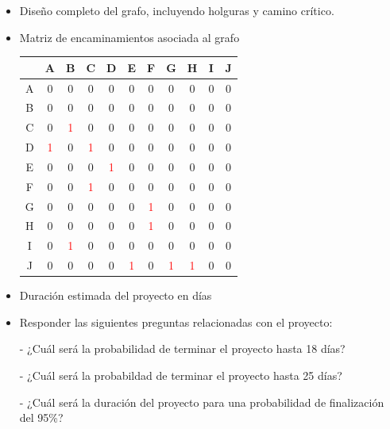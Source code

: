 \documentclass[12pt]{article}
\begin{document}
\begin{itemize}
    \item Diseño completo del grafo, incluyendo holguras y camino crítico.


    \item Matriz de encaminamientos asociada al grafo

    \begin{center}
      \begin{tabular}{c|cccccccccc}
             & A & B & C & D & E & F & G & H & I & J \\
        \hline
          A  & 0& 0& 0& 0& 0& 0& 0& 0& 0 & 0 \\
          B  & 0& 0& 0& 0& 0& 0& 0& 0& 0 & 0 \\ 
          C  & 0& \textcolor{red}{1}& 0& 0& 0& 0& 0& 0& 0 & 0 \\ 
          D  & \textcolor{red}{1}& 0& \textcolor{red}{1}& 0& 0& 0& 0& 0& 0 & 0 \\ 
          E  & 0& 0& 0& \textcolor{red}{1}& 0& 0& 0& 0& 0 & 0 \\
          F  & 0& 0& \textcolor{red}{1}& 0& 0& 0& 0& 0& 0 & 0 \\
          G  & 0& 0& 0& 0& 0& \textcolor{red}{1}& 0& 0& 0 & 0 \\
          H  & 0& 0& 0& 0& 0& \textcolor{red}{1}& 0& 0& 0 & 0 \\
          I  & 0& \textcolor{red}{1}& 0& 0& 0& 0& 0& 0& 0 & 0 \\
          J  & 0& 0& 0& 0& \textcolor{red}{1}& 0& \textcolor{red}{1}& \textcolor{red}{1}& 0 & 0 
      \end{tabular}
    \end{center}

    \item Duración estimada del proyecto en días
    \item Responder las siguientes preguntas relacionadas con el proyecto:

    - ¿Cuál será la probabilidad de terminar el proyecto hasta 18 días?

    - ¿Cuál será la probabildad de terminar el proyecto hasta 25 días?

- ¿Cuál será la duración del proyecto para una probabilidad de finalización del
95\%?
    
\end{itemize}
\end{document}
